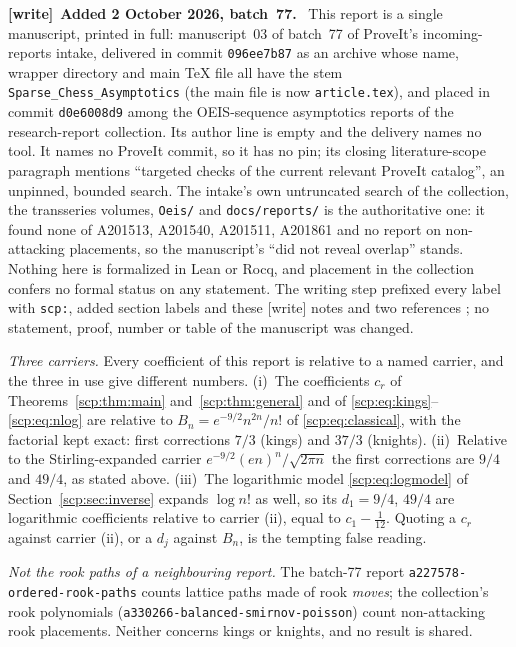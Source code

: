 \documentclass[11pt]{article}
\newenvironment{writenote}[1][]{\par\smallskip\begingroup\small
 \noindent\textbf{[write]}\if\relax\detokenize{#1}\relax\else~\textbf{#1.}\fi\ }%
 {\par\endgroup\smallskip}
\begin{document}
\begin{writenote}[Added 2 October 2026, batch~77]
This report is a single manuscript, printed in full: manuscript~03 of
batch~77 of ProveIt's incoming-reports intake, delivered in commit \texttt{096ee7b87} as an archive whose name, wrapper
directory and main \TeX{} file all have the stem
\texttt{Sparse\_Chess\_Asymptotics} (the main file is now
\texttt{article.tex}), and placed in commit \texttt{d0e6008d9} among the OEIS-sequence asymptotics
reports of the research-report collection. Its author line is empty and the
delivery names no tool. It names no ProveIt commit, so it has no pin; its
closing literature-scope paragraph mentions ``targeted checks of the current
relevant ProveIt catalog'', an unpinned, bounded search. The intake's own
untruncated search of the collection, the transseries volumes,
\texttt{Oeis/} and \texttt{docs/reports/} is the authoritative one: it found
none of A201513, A201540, A201511, A201861 and no report on non-attacking
placements, so the manuscript's ``did not reveal overlap'' stands. Nothing
here is formalized in Lean or Rocq, and placement in the collection confers
no formal status on any statement. The writing step prefixed every label with
\texttt{scp:}, added section labels and these \textsf{[write]} notes and two
references \cite{scp-tai,scp-cti}; no statement, proof, number or table of
the manuscript was changed.

\emph{Three carriers.} Every coefficient of this report is relative to a
named carrier, and the three in use give different numbers. (i)~The
coefficients $c_r$ of Theorems~\ref{scp:thm:main} and~\ref{scp:thm:general}
and of \eqref{scp:eq:kings}--\eqref{scp:eq:nlog} are relative to
$B_n=e^{-9/2}n^{2n}/n!$ of \eqref{scp:eq:classical}, with the factorial kept
exact: first corrections $7/3$ (kings) and $37/3$ (knights). (ii)~Relative to
the Stirling-expanded carrier $e^{-9/2}(en)^n/\sqrt{2\pi n}$ the first
corrections are $9/4$ and $49/4$, as stated above. (iii)~The logarithmic model
\eqref{scp:eq:logmodel} of Section~\ref{scp:sec:inverse} expands
$\log n!$ as well, so its $d_1=9/4$, $49/4$ are logarithmic coefficients
relative to carrier (ii), equal to $c_1-\tfrac1{12}$. Quoting a $c_r$ against
carrier (ii), or a $d_j$ against $B_n$, is the tempting false reading.

\emph{Not the rook paths of a neighbouring report.} The batch-77 report
\texttt{a227578-\allowbreak ordered-\allowbreak rook-\allowbreak paths}
counts lattice paths made of rook \emph{moves}; the collection's rook
polynomials (\texttt{a330266-\allowbreak balanced-\allowbreak smirnov-\allowbreak poisson})
count non-attacking rook placements. Neither concerns kings or knights, and
no result is shared.


\end{writenote}
\end{document}
